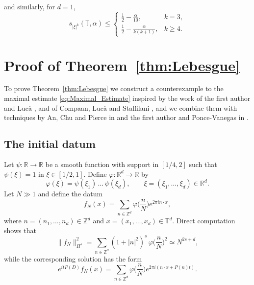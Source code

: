 \documentclass[11pt,reqno]{amsart}
\theoremstyle{definition}
\numberwithin{equation}{section}
\theoremstyle{remark}
\begin{document}
and similarly, for $d=1$, 
\begin{equation}\label{eq:General_Upper_Bound_Fractal_1D}
    s_{|\xi|^k}(\mathbb T,\alpha)
    \leq 
    \left\{
    \begin{array}{ll}
       \frac12 - \frac{\alpha}{10},   & k=3, \\
       \frac{1}{2} - \frac{\alpha}{k(k+1)},     & k \geq 4.
    \end{array}
    \right. 
\end{equation}





\section{Proof of Theorem~\ref{thm:Lebesgue}}


To prove Theorem~\ref{thm:Lebesgue} we construct a counterexample to the maximal estimate \eqref{eq:Maximal_Estimate}
inspired by the work of the first author and Lucà \cite{EceizabarrenaLuca2022}, 
and of Compaan, Lucà and Staffilani \cite{CompaanLucaStaffilani2021}, 
and we combine them with techniques by An, Chu and Pierce in \cite{AnChuPierce2023} and the first author and Ponce-Vanegas in \cite{EceizabarrenaPonceVanegas2022}.


\subsection{The initial datum}\label{sec:Datum}

Let $\psi:\mathbb R \to \mathbb R$ be a smooth function with support in $[1/4,2]$ such that $\psi(\xi) = 1$ in $\xi \in [1/2, 1]$. 
Define $\varphi:\mathbb R^d \to \mathbb R$ by 
\begin{equation}
    \varphi(\xi) = \psi(\xi_1)\, \ldots \, \psi(\xi_d), \qquad \xi = (\xi_1, \ldots, \xi_d) \in \mathbb R^d. 
\end{equation}
Let $N \gg 1$
and define the datum 
\begin{equation}\label{eq:Initial_Datum}
f_N(x) = \sum_{ n \in \mathbb Z^d } \varphi\Big( \frac{n}{N} \Big) e^{2 \pi  i n \cdot x},
\end{equation}
where $n = (n_1, \ldots, n_d) \in \mathbb Z^d$ and $x = (x_1, \ldots, x_d) \in \mathbb T^d$.
Direct computation shows that
\begin{equation}\label{eq:Norm_Of_Datum}
\lVert f_N \rVert_{H^s}^2 = \sum_{ n \in \mathbb Z^d } (1 + |n|^2)^s \, \varphi\Big( \frac{n}{N} \Big)^2
\simeq 
N^{2s + d}, 
\end{equation}
while the corresponding solution has the form
\begin{equation}\label{eq:Solution}
    e^{itP(D)}f_N(x) = \sum_{n \in \mathbb Z^d} \varphi\Big( \frac{n}{N} \Big) e^{2 \pi  i (n \cdot x + P(n) t)}. 
\end{equation}
\end{document}
